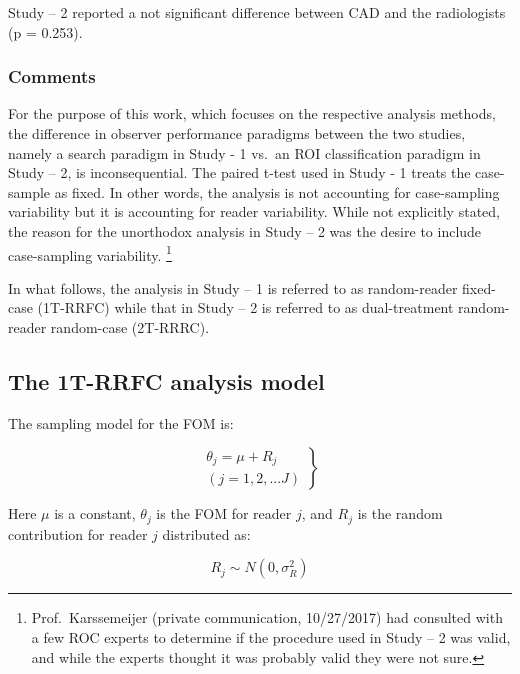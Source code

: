 \documentclass[
]{book}
\begin{document}
Study -- 2 reported a not significant difference between CAD and the radiologists (p = 0.253).

\hypertarget{standalone-cad-radiologists-comments}{%
\subsubsection{Comments}\label{standalone-cad-radiologists-comments}}

For the purpose of this work, which focuses on the respective analysis methods, the difference in observer performance paradigms between the two studies, namely a search paradigm in Study - 1 vs.~an ROI classification paradigm in Study -- 2, is inconsequential. The paired t-test used in Study - 1 treats the case-sample as fixed. In other words, the analysis is not accounting for case-sampling variability but it is accounting for reader variability. While not explicitly stated, the reason for the unorthodox analysis in Study -- 2 was the desire to include case-sampling variability. \footnote{Prof.~Karssemeijer (private communication, 10/27/2017) had consulted with a few ROC experts to determine if the procedure used in Study -- 2 was valid, and while the experts thought it was probably valid they were not sure.}

In what follows, the analysis in Study -- 1 is referred to as random-reader fixed-case (1T-RRFC) while that in Study -- 2 is referred to as dual-treatment random-reader random-case (2T-RRRC).

\hypertarget{the-1t-rrfc-analysis-model}{%
\subsection{The 1T-RRFC analysis model}\label{the-1t-rrfc-analysis-model}}

The sampling model for the FOM is:

\begin{equation}
\left.
\begin{aligned}
\theta_j=\mu+R_j \\
\left (j = 1,2,...J  \right )
\end{aligned}
\right \}
\label{eq:standalone-1t-rrfc}
\end{equation}

Here \(\mu\) is a constant, \(\theta_j\) is the FOM for reader \(j\), and \(R_j\) is the random contribution for reader \(j\) distributed as:

\begin{equation}
R_j \sim  N\left ( 0,\sigma_R^2 \right )
\label{eq:standalone-cad-2t-rrfc-rj-sampling}
\end{equation}
\end{document}

